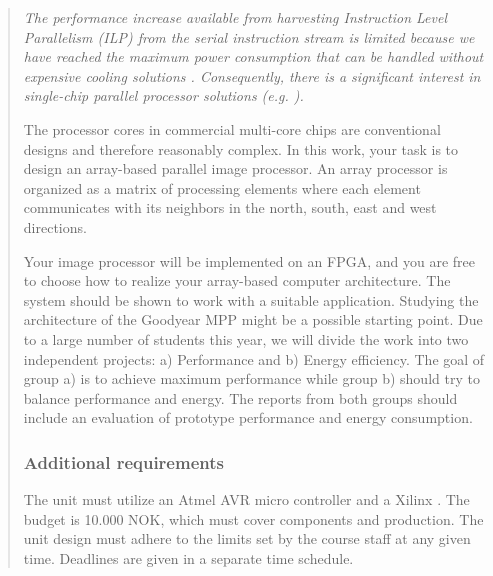 \begin{quotation}\em
The performance increase available from harvesting Instruction Level Parallelism
(ILP) from the serial instruction stream is limited because we have reached the
maximum power consumption that can be handled without expensive cooling
solutions \cite{olukotun2005future}. Consequently, there is a significant
interest in single-chip parallel processor solutions (e.g. \cite{bell2008tile64,
  kongetira2005niagara}).

The processor cores in commercial multi-core chips are conventional designs and
therefore reasonably complex. In this work, your task is to design an
array-based parallel image processor. An array processor is organized as a
matrix of processing elements where each element communicates with its neighbors
in the north, south, east and west directions.

Your image processor will be implemented on an FPGA, and you are free to choose
how to realize your array-based computer architecture. The system should be
shown to work with a suitable application. Studying the architecture of the
Goodyear MPP \cite{batcher1980design,wiki:goodyear} might be a possible starting
point.  Due to a large number of students this year, we will divide the work
into two independent projects: a) Performance and b) Energy efficiency. The goal
of group a) is to achieve maximum performance while group b) should try to
balance performance and energy. The reports from both groups should include an
evaluation of prototype performance and energy consumption.

\subsubsection*{Additional requirements}
The unit must utilize an Atmel AVR micro controller and a Xilinx
. The budget is 10.000 NOK, which must cover components and
 production. The unit design must adhere to the limits set by the
course staff at any given time. Deadlines are given in a separate time schedule.
\end{quotation}
